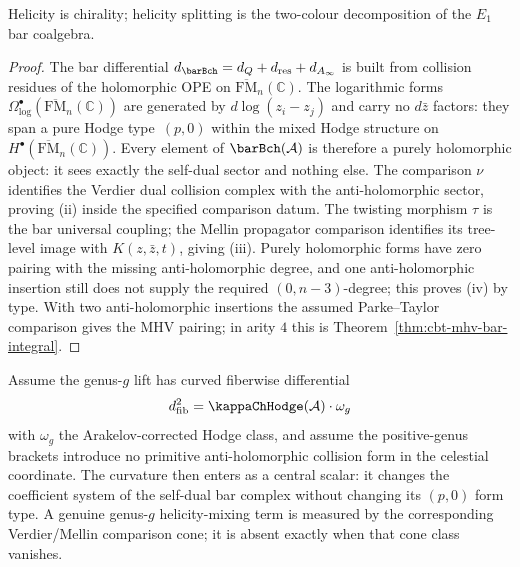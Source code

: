 \begin{theorem}
Helicity is chirality; helicity splitting is the two-colour decomposition of the $E_1$ bar coalgebra.
\end{theorem}

\begin{proof}
The bar differential $d_{\barBch} = d_Q + d_{\mathrm{res}} + d_{A_\infty}$ is built from collision residues of the holomorphic OPE on $\overline{\mathrm{FM}}_n(\mathbb{C})$. The logarithmic forms $\Omega^\bullet_{\log}(\overline{\mathrm{FM}}_n(\mathbb{C}))$ are generated by $d\log(z_i - z_j)$ and carry no $d\bar z$ factors: they span a pure Hodge type~$(p,0)$ within the mixed Hodge structure on $H^\bullet(\overline{\mathrm{FM}}_n(\mathbb{C}))$. Every element of $\barBch(\mathcal{A})$ is therefore a purely holomorphic object: it sees exactly the self-dual sector and nothing else.
The comparison $\nu$ identifies the Verdier dual collision complex with the anti-holomorphic
sector, proving \textup{(ii)} inside the specified comparison datum. The twisting morphism
\(\tau\) is the bar universal coupling; the Mellin propagator comparison identifies its
tree-level image with \(K(z,\bar z,t)\), giving \textup{(iii)}. Purely holomorphic forms have
zero pairing with the missing anti-holomorphic degree, and one anti-holomorphic insertion still
does not supply the required \((0,n-3)\)-degree; this proves \textup{(iv)} by type. With two
anti-holomorphic insertions the assumed Parke--Taylor comparison gives the MHV pairing; in
arity \(4\) this is Theorem~\ref{thm:cbt-mhv-bar-integral}.
\end{proof}

\begin{remark}
\label{rem:ch-core-helicity-splitting-genus}
Assume the genus-$g$ lift has curved fiberwise differential
\[
d^2_{\mathrm{fib}}=\kappaChHodge(\mathcal A)\cdot\omega_g
\]
with \(\omega_g\) the Arakelov-corrected Hodge class, and assume the positive-genus brackets
introduce no primitive anti-holomorphic collision form in the celestial coordinate. The
curvature then enters as a central scalar: it changes the coefficient system of the self-dual
bar complex without changing its \((p,0)\) form type. A genuine genus-$g$ helicity-mixing term
is measured by the corresponding Verdier/Mellin comparison cone; it is absent exactly when
that cone class vanishes.
\end{remark}

